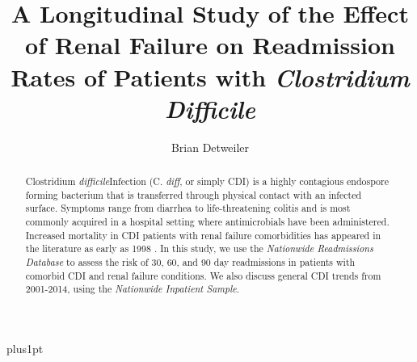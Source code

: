 \documentclass[12pt]{ociamthesis}\usepackage[]{graphicx}\usepackage[]{color}
\title{A Longitudinal Study of the Effect of Renal Failure on Readmission Rates of Patients with \textit{Clostridium Difficile}}
\author{Brian Detweiler}
\newcommand{\cdifficile}{Clostridium \textit{difficile}}
\newcommand{\cdiff}{C. \textit{diff}}
\begin{document}
\baselineskip=18pt plus1pt

\setcounter{secnumdepth}{3}
\setcounter{tocdepth}{3}


\maketitle                  %

 


\begin{abstract}
\cdifficile Infection (\cdiff, or simply CDI) 
is a highly contagious endospore forming bacterium that is transferred
through physical contact with an infected surface. Symptoms range from diarrhea to
life-threatening colitis and is most commonly acquired in a hospital setting where
antimicrobials have been administered. Increased mortality in
CDI patients with renal failure comorbidities has appeared in the literature as early as 1998 \cite{Cunney1998}.
In this study, we use the \textit{Nationwide Readmissions Database} to assess the risk of 
30, 60, and 90 day readmissions in patients with comorbid 
CDI and renal failure conditions. We also discuss general CDI trends from 2001-2014, using the 
\textit{Nationwide Inpatient Sample}. 
\end{abstract}

\begin{romanpages}          %
\tableofcontents            %
\listoffigures              %
\listoftables
\end{romanpages}            %


















\end{document}
